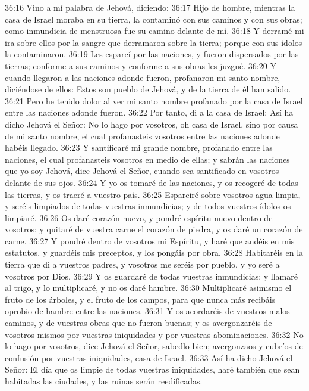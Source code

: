 36:16 Vino a mí palabra de Jehová, diciendo:   
36:17 Hijo de hombre, mientras la casa de Israel moraba en su tierra, la contaminó con sus caminos y con sus obras; como inmundicia de menstruosa fue su camino delante de mí.   
36:18 Y derramé mi ira sobre ellos por la sangre que derramaron sobre la tierra; porque con sus ídolos la contaminaron.   
36:19 Les esparcí por las naciones, y fueron dispersados por las tierras; conforme a sus caminos y conforme a sus obras les juzgué.   
36:20 Y cuando llegaron a las naciones adonde fueron, profanaron mi santo nombre, diciéndose de ellos: Estos son pueblo de Jehová, y de la tierra de él han salido.   
36:21 Pero he tenido dolor al ver mi santo nombre profanado por la casa de Israel entre las naciones adonde fueron.   
36:22 Por tanto, di a la casa de Israel: Así ha dicho Jehová el Señor: No lo hago por vosotros, oh casa de Israel, sino por causa de mi santo nombre, el cual profanasteis vosotros entre las naciones adonde habéis llegado.   
36:23 Y santificaré mi grande nombre, profanado entre las naciones, el cual profanasteis vosotros en medio de ellas; y sabrán las naciones que yo soy Jehová, dice Jehová el Señor, cuando sea santificado en vosotros delante de sus ojos.   
36:24 Y yo os tomaré de las naciones, y os recogeré de todas las tierras, y os traeré a vuestro país.   
36:25 Esparciré sobre vosotros agua limpia, y seréis limpiados de todas vuestras inmundicias; y de todos vuestros ídolos os limpiaré.   
36:26 Os daré corazón nuevo, y pondré espíritu nuevo dentro de vosotros; y quitaré de vuestra carne el corazón de piedra, y os daré un corazón de carne.   
36:27 Y pondré dentro de vosotros mi Espíritu, y haré que andéis en mis estatutos, y guardéis mis preceptos, y los pongáis por obra.   
36:28 Habitaréis en la tierra que di a vuestros padres, y vosotros me seréis por pueblo, y yo seré a vosotros por Dios. 
36:29 Y os guardaré de todas vuestras inmundicias; y llamaré al trigo, y lo multiplicaré, y no os daré hambre.   
36:30 Multiplicaré asimismo el fruto de los árboles, y el fruto de los campos, para que nunca más recibáis oprobio de hambre entre las naciones.   
36:31 Y os acordaréis de vuestros malos caminos, y de vuestras obras que no fueron buenas; y os avergonzaréis de vosotros mismos por vuestras iniquidades y por vuestras abominaciones.   
36:32 No lo hago por vosotros, dice Jehová el Señor, sabedlo bien; avergonzaos y cubríos de confusión por vuestras iniquidades, casa de Israel.   
36:33 Así ha dicho Jehová el Señor: El día que os limpie de todas vuestras iniquidades, haré también que sean habitadas las ciudades, y las ruinas serán reedificadas.   
